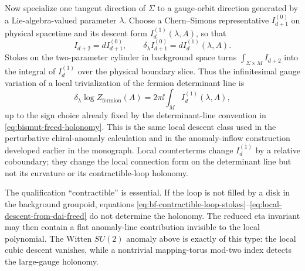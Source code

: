 Now specialize one tangent direction of \(\Sigma\) to a gauge-orbit
direction generated by a Lie-algebra-valued parameter \(\lambda\).  Choose a
Chern--Simons representative \(I_{d+1}^{(0)}\) on physical spacetime and its
descent form \(I_d^{(1)}(\lambda,A)\), so that
\begin{equation}
  I_{d+2}=d I_{d+1}^{(0)},
  \qquad
  \delta_\lambda I_{d+1}^{(0)}
  =
  d I_d^{(1)}(\lambda,A).
  \label{eq:local-descent-from-family-curvature}
\end{equation}
Stokes on the two-parameter cylinder in background space turns
\(\int_{\Sigma\times M}I_{d+2}\) into the integral of
\(I_d^{(1)}\) over the physical boundary slice.  Thus the infinitesimal
gauge variation of a local trivialization of the fermion determinant line is
\begin{equation}
  \delta_\lambda\log Z_{\mathrm{fermion}}(A)
  =
  2\pi\ii\int_M I_d^{(1)}(\lambda,A),
  \label{eq:local-descent-from-dai-freed}
\end{equation}
up to the sign choice already fixed by the determinant-line convention in
\eqref{eq:bismut-freed-holonomy}.  This is the same local descent class used
in the perturbative chiral-anomaly calculation and in the anomaly-inflow
construction developed earlier in the monograph.
Local counterterms change \(I_d^{(1)}\) by a relative coboundary; they change
the local connection form on the determinant line but not its curvature or
its contractible-loop holonomy.

The qualification ``contractible'' is essential.  If the loop is not filled
by a disk in the background groupoid, equations
\eqref{eq:bf-contractible-loop-stokes}--\eqref{eq:local-descent-from-dai-freed}
do not determine the holonomy.  The reduced eta invariant may then contain a
flat anomaly-line contribution invisible to the local polynomial.  The
Witten \(SU(2)\) anomaly above is exactly of this type: the local cubic
descent vanishes, while a nontrivial mapping-torus mod-two index detects the
large-gauge holonomy.

